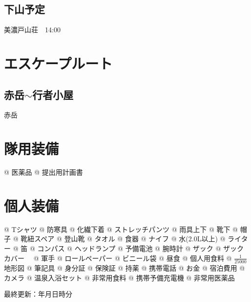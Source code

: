 \documentclass[a4paper,twocolumn,landscape]{jsarticle}
\begin{document}
\subsection*{下山予定}
美濃戸山荘　14:00

\section{エスケープルート}
\subsection*{赤岳$\sim$行者小屋}
赤岳

\newpage
\section{隊用装備}
\begin{multicols}{2}
\begin{easylist}[checklist]
@ 医薬品
@ 提出用計画書
\end{easylist}
\end{multicols}

\section{個人装備}
\begin{multicols}{2}
\begin{easylist}[checklist]
@ Tシャツ
@ 防寒具
@ 化繊下着
@ ストレッチパンツ
@ 雨具上下
@ 靴下
@ 帽子
@ 靴紐スペア
@ 登山靴
@ タオル
@ 食器
@ ナイフ
@ 水(2.0L以上)
@ ライター
@ 笛
@ コンパス
@ ヘッドランプ
@ 予備電池
@ 腕時計
@ ザック
@ ザックカバー　
@ 軍手
@ ロールペーパー
@ ビニール袋
@ 昼食
@ 個人用食料
@ $\frac{1}{25000}$地形図
@ 筆記具
@ 身分証
@ 保険証
@ 持薬
@ 携帯電話
@ お金
@ 宿泊費用
@ カメラ
@ 温泉入浴セット
@ 非常用食料
@ 携帯予備充電機
@ 非常用医薬品
\end{easylist}
\end{multicols}

\makeatletter
最終更新：\the\year 年\two@digits\month 月\two@digits\day 日\two@digits\hour 時\two@digits\minute 分
\makeatother
\end{document}
